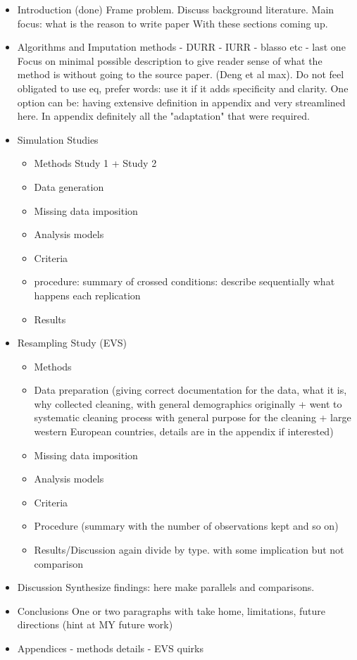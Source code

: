 \begin{itemize}
 \item Introduction (done)
	Frame problem. Discuss background literature.
	Main focus: what is the reason to write paper
	With these sections coming up.

 \item Algorithms and Imputation methods
	- DURR
	- IURR
	- blasso
	etc
	- last one
	Focus on minimal possible description to give reader sense of what the method is
	without going to the source paper. (Deng et al max). Do not feel obligated to use
	eq, prefer words: use it if it adds specificity and clarity.
	One option can be: having extensive definition in appendix and very streamlined 
	here. In appendix definitely all the "adaptation" that were required.
 \item Simulation Studies

  \begin{itemize}
   \item Methods
	Study 1 + Study 2
   	    \item Data generation
	    \item Missing data imposition
	    \item Analysis models
	    \item Criteria
		\item procedure: summary of crossed conditions: describe sequentially 
			what happens each replication
   \item Results
  \end{itemize}

 \item Resampling Study (EVS)
  \begin{itemize}
	\item Methods
	   \item Data preparation (giving correct documentation for the data, what it is, 
		   why collected cleaning, with general demographics originally + went to
		   systematic cleaning process with general purpose for the cleaning + 
		   large western European countries, details are in the appendix if 
		   interested)
	   \item Missing data imposition
	   \item Analysis models
	   \item Criteria
	   \item Procedure (summary with the number of observations kept and so on)
	\item Results/Discussion
		again divide by type. with some implication but not comparison
  \end{itemize}

 \item Discussion
	Synthesize findings: here make parallels and comparisons.

 \item Conclusions 
	 One or two paragraphs with take home, limitations, future directions (hint at 
	 MY future work)

 \item Appendices
 - methods details
 - EVS quirks
\end{itemize}


